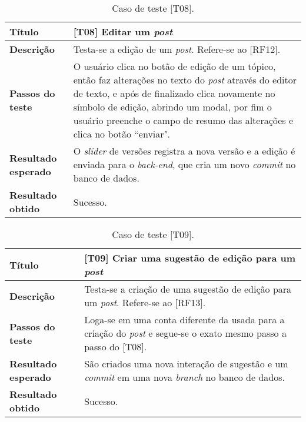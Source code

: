 \begin{table}[hbt!]
    \centering
    \begin{tabularx}{0.9\textwidth}{l|X}
    \hline
    \textbf {Título} & [T08] Editar um \textit{post} \\\hline
    \textbf {Descrição} & Testa-se a edição de um \textit{post}. Refere-se ao [RF12]. \\ \hline
    \textbf {Passos do teste} & O usuário clica no botão de edição de um tópico, então faz alterações no texto do \textit{post} através do editor de texto, e após de finalizado clica novamente no símbolo de edição, abrindo um modal, por fim o usuário preenche o campo de resumo das alterações e clica no botão “enviar". \\ \hline
    \textbf {Resultado esperado}& O \textit{slider} de versões registra a nova versão e a edição é enviada para o \textit{back-end}, que cria um novo \textit{commit} no banco de dados. \\ \hline
    \textbf {Resultado obtido} & Sucesso. \\ \hline
    \end{tabularx}
    \caption{Caso de teste [T08].}
\end{table}

\begin{table}[hbt!]
    \centering
    \begin{tabularx}{0.9\textwidth}{l|X}
    \hline
    \textbf {Título} & [T09] Criar uma sugestão de edição para um \textit{post} \\\hline
    \textbf {Descrição} & Testa-se a criação de uma sugestão de edição para um \textit{post}. Refere-se ao [RF13]. \\ \hline
    \textbf {Passos do teste} & Loga-se em uma conta diferente da usada para a criação do \textit{post} e segue-se o exato mesmo passo a passo do [T08]. \\ \hline
    \textbf {Resultado esperado}& São criados uma nova interação de sugestão e um \textit{commit} em uma nova \textit{branch} no banco de dados. \\ \hline
    \textbf {Resultado obtido} & Sucesso. \\ \hline
    \end{tabularx}
    \caption{Caso de teste [T09].}
\end{table}

